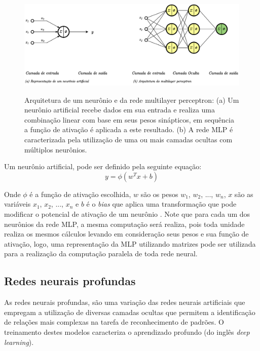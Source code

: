 \begin{figure}[htbp]
	\centering
	\caption[Arquitetura de um neurônio e da rede multilayer perceptron]{Arquitetura de um neurônio e da rede multilayer perceptron: (a) Um neurônio artificial recebe dados em sua entrada e realiza uma combinação linear com base em seus pesos sinápticos, em sequência a função de ativação é aplicada a este resultado. (b) A rede MLP é caracterizada pela utilização de uma ou mais camadas ocultas com múltiplos neurônios.}
		\includegraphics[scale=.25]{imagens/perceptron.png}
	\label{fig:perceptron}
\end{figure}

Um neurônio artificial, pode ser definido pela seguinte equação:
\begin{equation}
    y = \phi(w^{T}x + b)
\end{equation}

Onde $\phi$ é a função de ativação escolhida, $w$ são os pesos $w_1$, $w_2$, ..., $w_n$, $x$ são as variáveis $x_1$, $x_2$, ..., $x_n$ e $b$ é o \textit{bias} que aplica uma transformação que pode modificar o potencial de ativação de um neurônio \cite{haykinNeuralNetworksLearning2009}. Note que para cada um dos neurônios da rede MLP, a mesma computação será realiza, pois toda unidade realiza os mesmos cálculos levando em consideração seus pesos e sua função de ativação, logo, uma representação da MLP utilizando matrizes pode ser utilizada para a realização da computação paralela de toda rede neural.

\subsection{Redes neurais profundas}

As redes neurais profundas, são uma variação das redes neurais artificiais que empregam a utilização de diversas camadas ocultas que permitem a identificação de relações mais complexas na tarefa de reconhecimento de padrões. O treinamento destes modelos caracteriza o aprendizado profundo (do inglês \textit{deep learning}).

